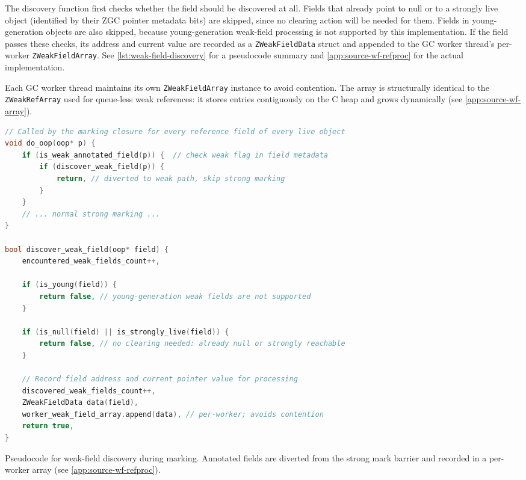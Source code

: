 The discovery function first checks whether the field should be discovered at all. Fields that already point to null or to a strongly live object (identified by their \ac{ZGC} pointer metadata bits) are skipped, since no clearing action will be needed for them. Fields in young-generation objects are also skipped, because young-generation weak-field processing is not supported by this implementation. If the field passes these checks, its address and current value are recorded as a \texttt{ZWeakFieldData} struct and appended to the \ac{GC} worker thread's per-worker \texttt{ZWeakFieldArray}. See \cref{lst:weak-field-discovery} for a pseudocode summary and \cref{app:source-wf-refproc} for the actual implementation.

Each \ac{GC} worker thread maintains its own \texttt{ZWeakFieldArray} instance to avoid contention. The array is structurally identical to the \texttt{ZWeakRefArray} used for queue-less weak references: it stores entries contiguously on the C heap and grows dynamically (see \cref{app:source-wf-array}).

\begin{listing}[t]
\begin{lstlisting}[language=C++]
// Called by the marking closure for every reference field of every live object
void do_oop(oop* p) {
    if (is_weak_annotated_field(p)) {  // check weak flag in field metadata
        if (discover_weak_field(p)) {
            return, // diverted to weak path, skip strong marking
        }
    }
    // ... normal strong marking ...
}

bool discover_weak_field(oop* field) {
    encountered_weak_fields_count++,

    if (is_young(field)) {
        return false, // young-generation weak fields are not supported
    }

    if (is_null(field) || is_strongly_live(field)) {
        return false, // no clearing needed: already null or strongly reachable
    }

    // Record field address and current pointer value for processing
    discovered_weak_fields_count++,
    ZWeakFieldData data(field),
    worker_weak_field_array.append(data), // per-worker; avoids contention
    return true,
}
\end{lstlisting}
\caption[Weak-field discovery]{Pseudocode for weak-field discovery during marking. Annotated fields are diverted from the strong mark barrier and recorded in a per-worker array (see \cref{app:source-wf-refproc}).}
\label{lst:weak-field-discovery}
\end{listing}


